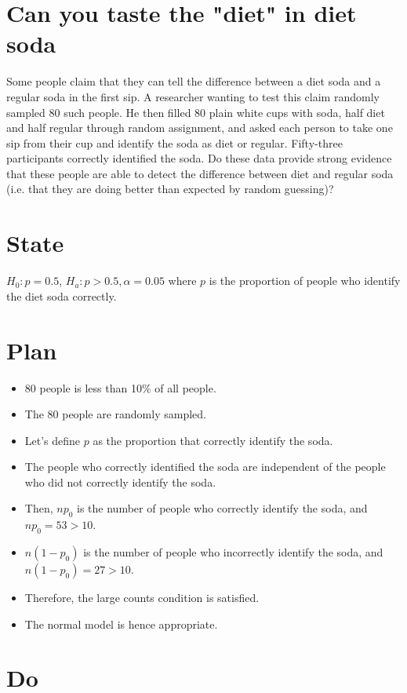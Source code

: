 \documentclass{scrreprt} %
\begin{document}
\section{Can you taste the "diet" in diet soda}

Some people claim that they can tell the difference between a diet soda and a regular soda in the
first sip. A researcher wanting to test this claim randomly sampled 80 such people. He then filled
80 plain white cups with soda, half diet and half regular through random assignment, and asked
each person to take one sip from their cup and identify the soda as diet or regular. Fifty-three
participants correctly identified the soda. Do these data provide strong evidence that these people
are able to detect the difference between diet and regular soda (i.e. that they are doing better
than expected by random guessing)?

\section{State}

$H_0: p = 0.5$, $H_a: p > 0.5, \alpha = 0.05$
where $p$ is the proportion of people who identify the diet soda correctly.

\section{Plan}

\begin{itemize}
	\item 80 people is less than 10\% of all people.
	\item The 80 people are randomly sampled.
	\item Let's define $p$ as the proportion that correctly identify the soda.
	\item The people who correctly identified the soda are independent of
	the people who did not correctly identify the soda.
	\item Then, $np_0$ is the number of people who correctly identify
	the soda, and $np_0 = 53 > 10$.
	\item $n(1-p_0)$ is the number of people who incorrectly identify the
	soda, and $n(1-p_0)= 27 > 10$.
	\item Therefore, the large counts condition is satisfied.
	\item The normal model is hence appropriate.
\end{itemize}

\section{Do}
\end{document}
